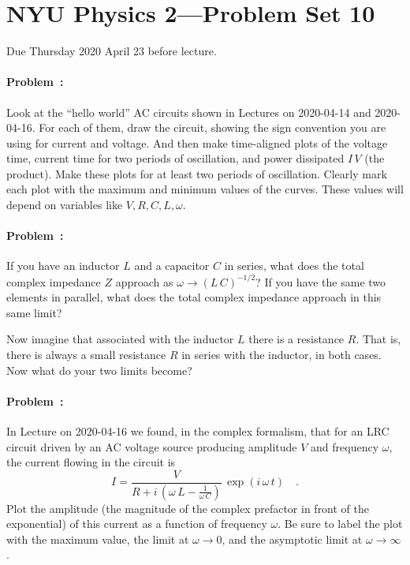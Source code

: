 \documentclass[12pt]{article}
\begin{document}
\section*{NYU Physics 2---Problem Set 10}

Due Thursday 2020 April 23 before lecture.

\paragraph{Problem~\theproblem:}%
Look at the ``hello world'' AC circuits shown in Lectures on
2020-04-14 and 2020-04-16. For each of them, draw the circuit, showing
the sign convention you are using for current and voltage. And then
make time-aligned plots of the voltage  time, current
 time for two periods of oscillation, and power dissipated
$I\,V$ (the product). Make these plots for at least two periods of
oscillation. Clearly mark each plot with the maximum and minimum
values of the curves. These values will depend on variables like $V,
R, C, L, \omega$.

\paragraph{Problem~\theproblem:}%
If you have an inductor $L$ and a capacitor $C$ in series, what does
the total complex impedance $Z$ approach as $\omega\rightarrow
(L\,C)^{-1/2}$? If you have the same two elements in parallel, what
does the total complex impedance approach in this same limit?

Now imagine that associated with the inductor $L$ there is a
resistance $R$. That is, there is always a small resistance $R$ in
series with the inductor, in both cases. Now what do your two limits
become?

\paragraph{Problem~\theproblem:}%
In Lecture on 2020-04-16 we found, in the complex formalism, that for
an LRC circuit driven by an AC voltage source producing amplitude $V$ and frequency $\omega$, the current flowing in the
circuit is
\begin{equation}\label{eq:res}
  I = \frac{V}{R + i\,\left(\omega\,L - \frac{1}{\omega\,C}\right)}\,\exp(i\,\omega\,t)
  \quad .
\end{equation}
Plot the amplitude (the magnitude of the complex prefactor in front of
the exponential) of this current as a function of frequency
$\omega$. Be sure to label the plot with the maximum value, the limit
at $\omega\rightarrow 0$, and the asymptotic limit at
$\omega\rightarrow\infty$.
\end{document}
